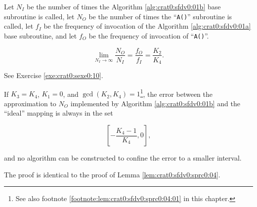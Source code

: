 \begin{vworklemmastatement}
\label{lem:crat0:sfdv0:sprc1:02}
Let $N_I$ be the number of times the Algorithm \ref{alg:crat0:sfdv0:01b}
base subroutine
is called, let $N_O$ be the number of times the 
``\texttt{A()}'' subroutine is called, let
$f_I$ be the frequency of invocation of the 
Algorithm \ref{alg:crat0:sfdv0:01a} base subroutine, and let 
$f_O$ be the frequency of invocation of 
``\texttt{A()}''.

\begin{equation}
\label{eq:lem:crat0:sfdv0:sprc1:02:01}
\lim_{N_I\rightarrow\infty}\frac{N_O}{N_I}
=
\frac{f_O}{f_I}
=
\frac{K_2}{K_4} . 
\end{equation} 
\end{vworklemmastatement}
\begin{vworklemmaproof}
See Exercise \ref{exe:crat0:sexe0:10}.
\end{vworklemmaproof}

\begin{vworklemmastatement}
\label{lem:crat0:sfdv0:sprc1:03}
If $K_3=K_4$, $K_1=0$, and $\gcd(K_2, K_4)=1$\footnote{See also
footnote \ref{footnote:lem:crat0:sfdv0:sprc0:04:01} in this chapter.}, the error between
the approximation to $N_O$ implemented by Algorithm \ref{alg:crat0:sfdv0:01b}
and the ``ideal'' mapping is always
in the set

\begin{equation}
\label{eq:lem:crat0:sfdv0:sprc1:03:01}
\left[ - \frac{K_4 - 1}{K_4} , 0 \right] ,
\end{equation}

and no algorithm can be constructed to 
confine the error to a smaller interval.
\end{vworklemmastatement}
\begin{vworklemmaproof}
The proof is identical to the proof of Lemma \ref{lem:crat0:sfdv0:sprc0:04}.
\end{vworklemmaproof}

